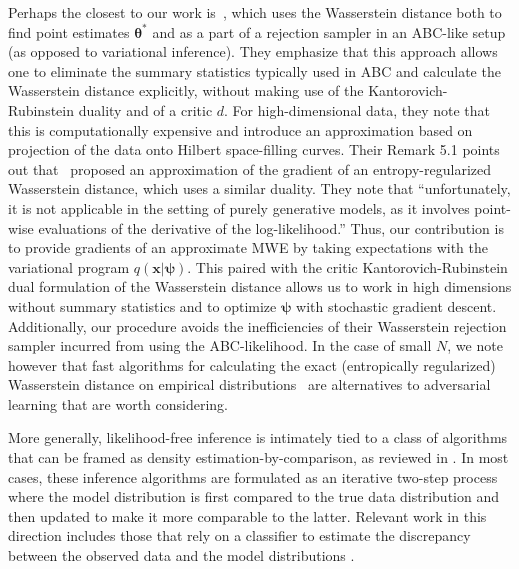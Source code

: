 \documentclass{article}
\newcommand{\bftheta}{{\bm \theta}}
\newcommand{\bfpsi}{{\bm \psi}}
\newcommand{\bfx}{\mathbf{x}}
\newcommand{\bfz}{\mathbf{z}}
\theoremstyle{plain}
\begin{document}
Perhaps the closest to our work is~\cite{bernton2017inference}, which uses the
Wasserstein distance both to find point estimates $\bftheta^*$ and as a part of
a rejection sampler in an ABC-like setup (as opposed to variational inference).
They emphasize that this approach allows one to eliminate the summary statistics
typically used in ABC and calculate the Wasserstein distance explicitly, without
making use of the Kantorovich-Rubinstein duality and of a critic $d$. For high-dimensional
data, they note that this is computationally expensive and introduce an
approximation based on projection of the data onto Hilbert space-filling curves.
Their Remark 5.1 points out that~\cite{montavon2016wasserstein} proposed an
approximation of the gradient of an entropy-regularized Wasserstein distance,
which uses a similar duality. They note that ``unfortunately, it is not
applicable in the setting of purely generative models, as it involves point-wise
evaluations of the derivative of the log-likelihood.'' Thus, our contribution is
to provide gradients of an approximate MWE by taking expectations with the
variational program $q(\bfx | \bfpsi)$. This paired with the critic
Kantorovich-Rubinstein dual formulation of the Wasserstein distance
allows us to work in high dimensions without summary statistics and to
optimize $\bfpsi$ with stochastic gradient descent. Additionally,
our procedure avoids the inefficiencies of
their Wasserstein rejection sampler incurred from using the ABC-likelihood.
In the case of small $N$, we note however that fast algorithms for calculating the exact (entropically regularized) Wasserstein distance on
empirical distributions~\cite{cuturi2013sinkhorn, genevay2016stochastic, montavon2016wasserstein}
are alternatives to adversarial learning that are worth considering.

More generally, likelihood-free
inference is intimately tied to a class of algorithms that can be framed as
density estimation-by-comparison, as reviewed in \cite{2016arXiv161003483M}. In most cases, these
inference algorithms are formulated as an iterative two-step process where the
model distribution is first compared to the true data distribution and then
updated to make it more comparable to the latter. Relevant work in this
direction includes those that rely on a classifier to estimate the discrepancy between the observed data and the model distributions
\cite{gutmann2012noise,cranmer2015approximating,cranmer2016experiments,2016arXiv161110242D,gutmann2017likelihood,rosca2017variational}.
\end{document}
